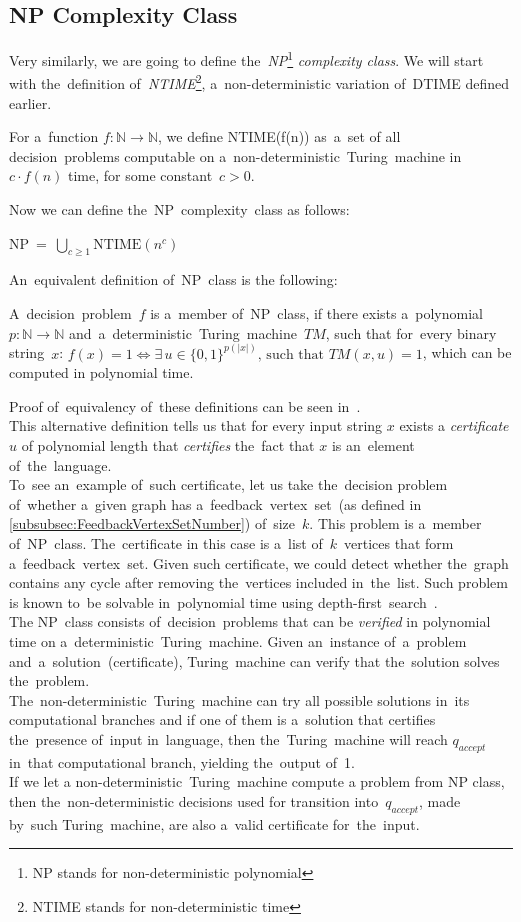 \subsection{NP Complexity Class}
Very similarly, we are going to define the~\textit{NP}\footnote{NP stands for non-deterministic polynomial} \textit{complexity class}. We will start with the~definition of~\textit{NTIME}\footnote{NTIME stands for non-deterministic time}, a~non-deterministic variation of~DTIME defined earlier.
\begin{definition}[NTIME]
    For a~function ${f : \mathbb{N} \rightarrow \mathbb{N}}$, we define NTIME(f(n)) as~a~set of all decision~problems computable on a~non-deterministic~Turing~machine in~${c \cdot f(n)}$ time, for some constant~${c > 0}$.
\end{definition}
Now we can define the~NP~complexity~class as follows:
\begin{definition}
    NP~=~$\bigcup_{c \geq 1}\text{NTIME}(n^c)$
\end{definition}
An~equivalent definition of~NP~class is the following:
\begin{definition}
    A~decision~problem~$f$ is a~member of~NP~class, if there exists a~polynomial $p: \mathbb{N} \rightarrow \mathbb{N}$ and~a~deterministic~Turing~machine~$TM$, such that for~every binary string~$x$:
    ${f(x) = 1 \iff \exists\,u \in \{0, 1\}^{p(|x|)} \text{, such that } TM(x, u) = 1}$, which can be computed in polynomial time.
\end{definition}
Proof of~equivalency of~these definitions can be seen in~\cite{Arora}.\\
This alternative definition tells us that for every input string $x$ exists a \textit{certificate} $u$ of polynomial length that \textit{certifies} the~fact that $x$ is an~element of~the~language. \\
To~see an~example of~such certificate, let us take the~decision problem of~whether a~given graph has a~feedback~vertex~set~(as defined in \autoref{subsubsec:FeedbackVertexSetNumber}) of~size~$k$. This problem is a~member of~NP~class. The~certificate in this case is a~list of~$k$~vertices that form a~feedback~vertex~set. Given such certificate, we could detect whether the~graph contains any cycle after removing the~vertices included in~the~list. Such problem is known to~be solvable in~polynomial time using depth-first~search~\cite{Diestel}.\\
The NP~class consists of~decision~problems that can be \textit{verified} in polynomial time on a~deterministic~Turing~machine. Given an~instance of~a~problem and~a~solution~(certificate), Turing~machine can verify that the~solution solves the~problem. \\
The~non-deterministic~Turing~machine can try all possible solutions in~its computational branches and if one of them is a~solution that certifies the~presence of~input in~language, then the~Turing~machine will reach $q_{accept}$ in~that computational branch, yielding the~output of~1. \\
If we let a non-deterministic~Turing~machine compute a problem from NP class, then the~non-deterministic decisions used for transition into~$q_{accept}$, made by~such Turing~machine, are also a~valid certificate for~the~input.
